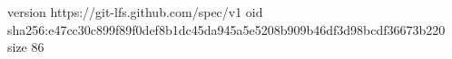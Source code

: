 version https://git-lfs.github.com/spec/v1
oid sha256:e47cc30c899f89f0def8b1dc45da945a5e5208b909b46df3d98bcdf36673b220
size 86
